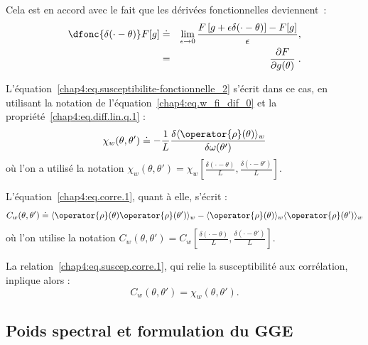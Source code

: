 Cela est en accord avec le fait que les dérivées fonctionnelles deviennent :
\begin{eqnarray}\label{chap4:eq.w_fi_dif_0}
	\dfonc{\delta(\cdot - \theta)} F[g] &\doteq& \lim_{\epsilon \to 0} \frac{F\left[g + \epsilon \delta(\cdot - \theta)\right] - F[g]}{\epsilon}, \\
	& = & \left. \frac{\partial F}{\partial g(\theta)} \right. .
\end{eqnarray}



L’équation~\eqref{chap4:eq.susceptibilite-fonctionnelle_2} s’écrit dans ce cas, en utilisant la notation de l’équation~\eqref{chap4:eq.w_fi_dif_0} et la propriété~\eqref{chap4:eq.diff.lin.q.1} :
\begin{equation}\label{chap4:eq.susceptibilite-fonctionnelle_3}
	\chi_w(\theta, \theta') \doteq -\frac{1}{L} \frac{\delta \langle \operator{\rho}(\theta) \rangle_w}{\delta \omega(\theta')} 
\end{equation}
où l’on a utilisé la notation $\chi_w(\theta, \theta') = \chi_w\left[\frac{\delta(\cdot - \theta)}{L}, \frac{\delta(\cdot - \theta')}{L} \right]$.

\medskip


L’équation~\eqref{chap4:eq.corre.1}, quant à elle, s’écrit :
\begin{equation}\label{chap4:eq.corre.2}
C_w(\theta, \theta') \doteq \langle \operator{\rho}(\theta) \operator{\rho}(\theta') \rangle_w - \langle \operator{\rho}(\theta) \rangle_w \langle \operator{\rho}(\theta') \rangle_w 
\end{equation}
où l’on utilise la notation $C_w(\theta, \theta') = C_w\left[ \frac{\delta(\cdot - \theta)}{L}, \frac{\delta(\cdot - \theta')}{L} \right]$.

\medskip


La relation~\eqref{chap4:eq.suscep.corre.1}, qui relie la susceptibilité aux corrélation, inplique alors :
\begin{equation}\label{chap4:eq.suscep.corre.1111}
	C_w(\theta, \theta') = \chi_w(\theta, \theta').
\end{equation}


\subsection{Poids spectral et formulation du GGE}


